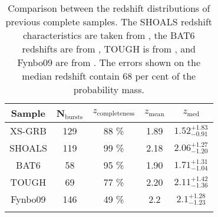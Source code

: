 \begin{table}[H]
	\centering
	\begin{tabular}{ccccc}
		\hline
		\hline\noalign{\smallskip}
		{Sample} & {N$_{\mathrm{bursts}}$} & {$z_{\mathrm{completeness}}$} &  {$z_{\mathrm{mean}}$} &  {$z_{\mathrm{med}}$} \\
		\hline\noalign{\smallskip}
		{\smallskip}
		XS-GRB & 129 & 88 \% & 1.89 & $1.52_{-0.91}^{+1.83}$ \\
		{\smallskip}
		SHOALS  & 119 &  99 \% &  2.18  & $2.06_{-1.20}^{+1.27}$ \\
		{\smallskip}
		BAT6 & 58 & 95 \% &  1.90 &  $1.71_{-1.04}^{+1.31}$ \\
		{\smallskip}
		TOUGH & 69 &  77 \% & 2.20 & $2.11_{-1.36}^{+1.42}$ \\
		{\smallskip}
		Fynbo09 & 146 &  49 \% &  2.2 & $2.1_{-1.23}^{+1.28}$ \\
		\hline\noalign{\smallskip}

\end{tabular} 

\caption{Comparison between the redshift distributions of previous complete
	samples. The SHOALS redshift characteristics are taken from \citet{Perley2016a},
	the BAT6 redshifts are from \citet{Salvaterra2012}, TOUGH is from
	\cite{Hjorth2012}, and Fynbo09 are from \citet{Fynbo2009}. The errors shown on
	the median redshift contain 68 per cent of the probability mass.
	\label{tab:redshift_comparison}}



\end{table}